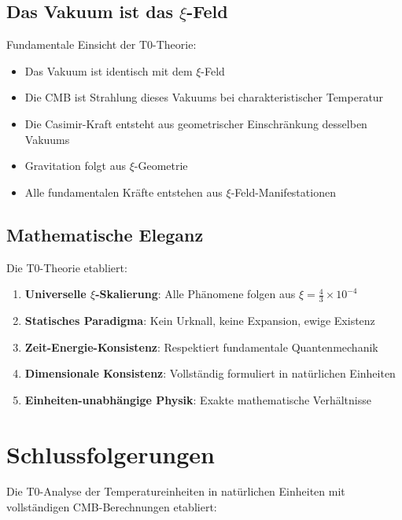 \documentclass[12pt,a4paper]{article}
\begin{document}
	\subsection{Das Vakuum ist das $\xi$-Feld}
	
	\begin{important}
		Fundamentale Einsicht der T0-Theorie:
		\begin{itemize}
			\item Das Vakuum ist identisch mit dem $\xi$-Feld
			\item Die CMB ist Strahlung dieses Vakuums bei charakteristischer Temperatur
			\item Die Casimir-Kraft entsteht aus geometrischer Einschränkung desselben Vakuums
			\item Gravitation folgt aus $\xi$-Geometrie
			\item Alle fundamentalen Kräfte entstehen aus $\xi$-Feld-Manifestationen
		\end{itemize}
	\end{important}
	
	\subsection{Mathematische Eleganz}
	
	Die T0-Theorie etabliert:
	\begin{enumerate}
		\item \textbf{Universelle $\xi$-Skalierung}: Alle Phänomene folgen aus $\xi = \frac{4}{3} \times 10^{-4}$
		\item \textbf{Statisches Paradigma}: Kein Urknall, keine Expansion, ewige Existenz
		\item \textbf{Zeit-Energie-Konsistenz}: Respektiert fundamentale Quantenmechanik
		\item \textbf{Dimensionale Konsistenz}: Vollständig formuliert in natürlichen Einheiten
		\item \textbf{Einheiten-unabhängige Physik}: Exakte mathematische Verhältnisse
	\end{enumerate}
	
	\section{Schlussfolgerungen}
	
	Die T0-Analyse der Temperatureinheiten in natürlichen Einheiten mit vollständigen CMB-Berechnungen etabliert:
	
\end{document}
